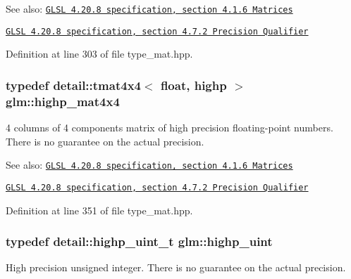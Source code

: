 \begin{Desc}
\item[See also:]\href{http://www.opengl.org/registry/doc/GLSLangSpec.4.20.8.pdf}{\tt GLSL 4.20.8 specification, section 4.1.6 Matrices} 

\href{http://www.opengl.org/registry/doc/GLSLangSpec.4.20.8.pdf}{\tt GLSL 4.20.8 specification, section 4.7.2 Precision Qualifier} \end{Desc}


Definition at line 303 of file type\_\-mat.hpp.\hypertarget{group__core__precision_g231950d260be295a25d7340e2020f55c}{
\subsubsection[highp\_\-mat4x4]{\setlength{\rightskip}{0pt plus 5cm}typedef detail::tmat4x4$<$ float, highp $>$ {\bf glm::highp\_\-mat4x4}}}
\label{group__core__precision_g231950d260be295a25d7340e2020f55c}


4 columns of 4 components matrix of high precision floating-point numbers. There is no guarantee on the actual precision.

\begin{Desc}
\item[See also:]\href{http://www.opengl.org/registry/doc/GLSLangSpec.4.20.8.pdf}{\tt GLSL 4.20.8 specification, section 4.1.6 Matrices} 

\href{http://www.opengl.org/registry/doc/GLSLangSpec.4.20.8.pdf}{\tt GLSL 4.20.8 specification, section 4.7.2 Precision Qualifier} \end{Desc}


Definition at line 351 of file type\_\-mat.hpp.\hypertarget{group__core__precision_gbfd1cf11193324a5f77d3831b6ac3205}{
\subsubsection[highp\_\-uint]{\setlength{\rightskip}{0pt plus 5cm}typedef detail::highp\_\-uint\_\-t {\bf glm::highp\_\-uint}}}
\label{group__core__precision_gbfd1cf11193324a5f77d3831b6ac3205}


High precision unsigned integer. There is no guarantee on the actual precision.

